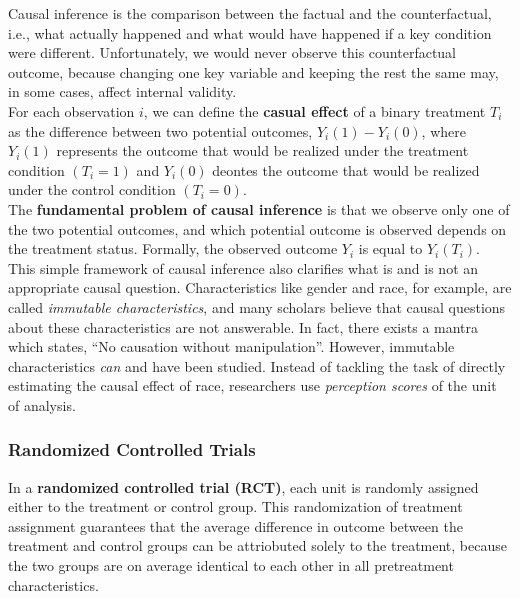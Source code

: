 \documentclass{article}
\begin{document}
    \noindent Causal inference is the comparison between the factual and
the counterfactual, i.e., what actually happened and what would have
happened if a key condition were different. Unfortunately, we would never
observe this counterfactual outcome, because changing one key variable and
keeping the rest the same may, in some cases, affect internal validity.\\

    \noindent For each observation $i$, we can define the
\textbf{casual effect} of a binary treatment $T_i$ as the difference between
two potential outcomes, $Y_i(1) - Y_i(0)$, where $Y_i(1)$ represents the
outcome that would be realized under the treatment condition $(T_i = 1)$ and $Y_i(0)$ deontes the outcome that would be realized under the control condition $(T_i = 0)$.\\

    \noindent The \textbf{fundamental problem of causal inference} is that
we observe only one of the two potential outcomes, and which potential
outcome is observed depends on the treatment status. Formally, the observed
outcome $Y_i$ is equal to $Y_i(T_i)$.\\

    \noindent This simple framework of causal inference also clarifies what
is and is not an appropriate causal question. Characteristics like gender
and race, for example, are called \textit{immutable characteristics}, and
many scholars believe that causal questions about these characteristics are
not answerable. In fact, there exists a mantra which states, ``No causation
without manipulation''. However, immutable characteristics \textit{can} and
have been studied. Instead of tackling the task of directly estimating the
causal effect of race, researchers use \textit{perception scores} of the
unit of analysis.

    \subsubsection{Randomized Controlled Trials}

    \noindent In a \textbf{randomized controlled trial (RCT)}, each unit is
randomly assigned either to the treatment or control group. This
randomization of treatment assignment guarantees that the average difference
in outcome between the treatment and control groups can be attriobuted
solely to the treatment, because the two groups are on average identical to
each other in all pretreatment characteristics.\\
\end{document}
